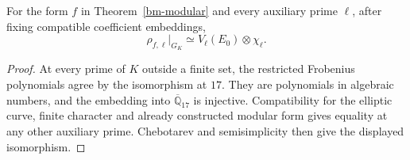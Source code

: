 \begin{lemma}
\label{bm-compatible}
For the form $f$ in Theorem~\ref{bm-modular} and every auxiliary
prime $\ell$, after fixing compatible coefficient embeddings,
\[
 \rho_{f,\ell}|_{G_K}
       \simeq V_\ell(E_0)\otimes\chi_\ell.
\]
\end{lemma}
\begin{proof}
At every prime of $K$ outside a finite set, the restricted
Frobenius polynomials agree by the isomorphism at $17$. They are
polynomials in algebraic numbers, and the embedding into
$\overline{\mathbb Q}_{17}$ is injective. Compatibility for the
elliptic curve, finite character and already constructed modular
form gives equality at any other auxiliary prime. Chebotarev and
semisimplicity then give the displayed isomorphism.
\end{proof}

